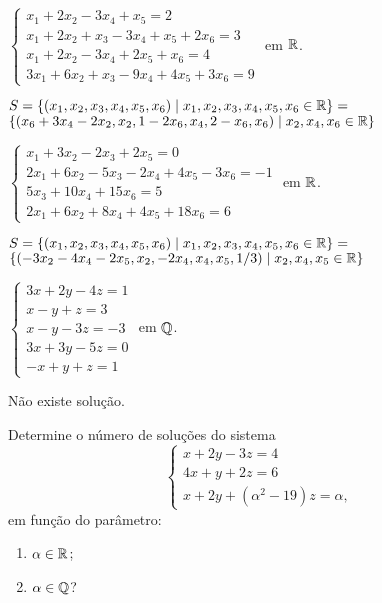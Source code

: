 \documentclass[12pt]{exam}
\begin{document}
\begin{exercicio}
  $
    \begin{cases}
      x_1 + 2x_2 - 3x_4 + x_5 = 2\\
      x_1 + 2x_2 + x_3 - 3x_4 + x_5 + 2x_6 = 3\\
      x_1 + 2x_2 - 3x_4 + 2x_5 + x_6 = 4\\
      3x_1 + 6x_2 + x_3 - 9x_4 + 4x_5 + 3x_6 = 9
    \end{cases}
  $
  em $\mathbb{R}$.
  \begin{solucao}
    $S = \{(x_1, x_2, x_3, x_4, x_5, x_6) \mid x_1, x_2, x_3, x_4, x_5, x_6 \in \mathbb{R}\} = $\\ $\{(x_6 + 3x_4 - 2x_2, x_2, 1 - 2x_6, x_4, 2 - x_6, x_6) \mid x_2, x_4, x_6 \in \mathbb{R}\}$
  \end{solucao}
\end{exercicio}

\begin{exercicio}
  $
    \begin{cases}
      x_1 + 3x_2 - 2x_3 + 2x_5 = 0\\
      2x_1 + 6x_2 - 5x_3 - 2x_4 + 4x_5 - 3x_6 = -1\\
      5x_3 + 10x_4 + 15x_6 = 5\\
      2x_1 + 6x_2 + 8x_4 + 4x_5 + 18x_6 = 6
    \end{cases}
  $
  em $\mathbb{R}$.
  \begin{solucao}
    $S = \{(x_1, x_2, x_3, x_4, x_5, x_6) \mid x_1, x_2, x_3, x_4, x_5, x_6 \in \mathbb{R}\} = $\\ $\{(-3x_2 - 4x_4 - 2x_5, x_2, -2x_4, x_4, x_5, 1/3) \mid x_2, x_4, x_5 \in \mathbb{R}\}$
  \end{solucao}
\end{exercicio}

\begin{exercicio}\label{sistema_linear_fim_gauss-jordan}
  $
    \begin{cases}
      3x + 2y - 4z = 1\\
      x - y + z = 3\\
      x - y - 3z = -3\\
      3x + 3y - 5z =0\\
      -x + y + z = 1
    \end{cases}
  $
  em $\mathbb{Q}$.
\begin{solucao}
  Não existe solução.
\end{solucao}
\end{exercicio}

\begin{exercicio}
  Determine o número de soluções do sistema
  \[
    \begin{cases}
      x + 2y - 3z = 4\\
      4x + y + 2z = 6\\
      x + 2y + (\alpha^2 - 19)z = \alpha,
    \end{cases}
\]
em função do parâmetro:
\begin{enumerate}[label={\alph*})]
   \item $\alpha \in \mathbb{R}$;
   \item $\alpha \in \mathbb{Q}$?
 \end{enumerate}
\end{exercicio}
\end{document}
